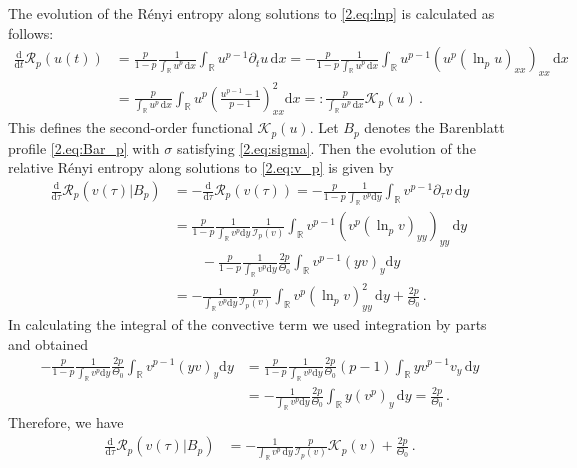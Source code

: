 \documentclass[12pt]{amsart}
\let\pa\partial
\newcommand{\R}{{\mathbb R}}
\newcommand{\K}{{\mathcal K}}
\newcommand{\renyi}{{\mathcal{R}}}
\newcommand{\dd}{{\mathrm{d}}}
\newcommand{\M}{\Theta}
\newcommand{\I}{\mathcal{I}}
\newcommand{\entropy}{\mathcal{H}}
\theoremstyle{plain}
\theoremstyle{definition}
\theoremstyle{remark}
\begin{document}
The evolution of the R\'enyi entropy along solutions to \eqref{2.eq:lnp} is calculated as follows:
\begin{align*}
    \frac{\dd}{\dd t}\renyi_p(u(t)) &= \frac{p}{1-p}\frac{1}{\int_\R u^p\, \dd x}\int_\R u^{p-1}\pa_t u\, \dd x
    = -\frac{p}{1-p}\frac{1}{\int_\R u^p\, \dd x}\int_\R u^{p-1}\left(u^p\left(\ln_{p}u\right)_{xx}\right)_{xx}\, \dd x\\
    &= \frac{p}{\int_\R u^p\, \dd x}\int_\R u^p\left(\frac{u^{p-1}-1}{p-1}\right)_{xx}^2\dd x =: \frac{p}{\int_\R u^p\, \dd x}\K_p(u)\,.
\end{align*}
This defines the second-order functional $\K_p(u)$.
Let $B_p$ denotes the Barenblatt profile \eqref{2.eq:Bar_p} with $\sigma$ satisfying \eqref{2.eq:sigma}. Then the evolution of the relative R\'enyi entropy along solutions to \eqref{2.eq:v_p} is given by
\begin{align*}
    \frac{\dd}{\dd \tau}\renyi_p(v(\tau)|B_p) &= - \frac{\dd}{\dd \tau}\renyi_p(v(\tau)) = -\frac{p}{1-p}\frac{1}{\int_\R v^p \dd y} \int_\R v^{p-1}\pa_\tau v\, \dd y\\
    &=  \frac{p}{1-p}\frac{1}{\int_\R v^p \dd y} \frac{1}{\I_p(v)} \int_\R v^{p-1}\left(v^p\left(\ln_{p}v\right)_{yy}\right)_{yy}\, \dd y \\
    &\qquad - \frac{p}{1-p}\frac{1}{\int_\R v^p \dd y} \frac{2p}{\M_0} \int_\R v^{p-1}(y v)_y\dd y\\
    &= -\frac{1}{\int_\R v^p \dd y} \frac{p}{\I_p(v)} \int_\R v^p\left(\ln_{p}v\right)_{yy}^2\, \dd y + \frac{2p}{\M_0}\,.
\end{align*}
In calculating the integral of the convective term we used integration by parts and obtained
\begin{align*}
    - \frac{p}{1-p}\frac{1}{\int_\R v^p \dd y} \frac{2p}{\M_0} \int_\R v^{p-1}(y v)_y\dd y &=
    \frac{p}{1-p}\frac{1}{\int_\R v^p \dd y} \frac{2p}{\M_0}(p-1) \int_\R y v^{p-1}v_y \,\dd y\\
    &= - \frac{1}{\int_\R v^p \dd y} \frac{2p}{\M_0} \int_\R y (v^{p})_y \,\dd y = \frac{2p}{\M_0}\,.
\end{align*}
Therefore, we have
\begin{align}\label{3.eq:rendiss2}
    \frac{\dd}{\dd \tau}\renyi_p(v(\tau)|B_p) &=  -\frac{1}{\int_\R v^p\, \dd y} \frac{p}{\I_p(v)} \K_p(v) + \frac{2p}{\M_0}\,.
\end{align}
\end{document}
